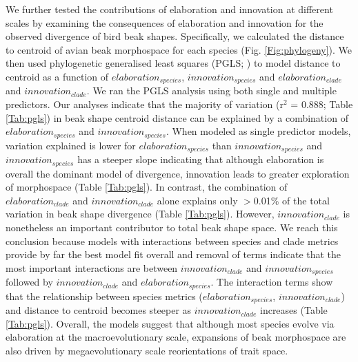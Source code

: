 \documentclass[12pt,letterpaper]{article}
\begin{document}
We further tested the contributions of elaboration and innovation at different scales by examining the consequences of elaboration and innovation for the observed divergence of bird beak shapes.
Specifically, we calculated the distance to centroid of avian beak morphospace for each species (Fig. \ref{Fig:phylogeny}).
We then used phylogenetic generalised least squares (PGLS; \cite{phylom}) to model distance to centroid as a function of $elaboration_{species}$, $innovation_{species}$ and $elaboration_{clade}$ and $innovation_{clade}$.
We ran the PGLS analysis using both single and multiple predictors.
Our analyses indicate that the majority of variation (r$^2$ = 0.888; Table \ref{Tab:pgls}) in beak shape centroid distance can be explained by a combination of $elaboration_{species}$ and $innovation_{species}$.
When modeled as single predictor models, variation explained is lower for $elaboration_{species}$ than $innovation_{species}$ and $innovation_{species}$ has a steeper slope indicating that although elaboration is overall the dominant model of divergence, innovation leads to greater exploration of morphospace (Table \ref{Tab:pgls}).
In contrast, the combination of $elaboration_{clade}$ and $innovation_{clade}$ alone explains only $>$0.01\% of the total variation in beak shape divergence (Table \ref{Tab:pgls}).
However, $innovation_{clade}$ is nonetheless an important contributor to total beak shape space.
We reach this conclusion because models with interactions between species and clade metrics provide by far the best model fit overall and removal of terms indicate that the most important interactions are between $innovation_{clade}$  and $innovation_{species}$ followed by $innovation_{clade}$ and $elaboration_{species}$.
The interaction terms show that the relationship between species metrics ($elaboration_{species}$, $innovation_{clade}$) and distance to centroid becomes steeper as $innovation_{clade}$ increases (Table \ref{Tab:pgls}).
Overall, the models suggest that although most species evolve via elaboration at the macroevolutionary scale, expansions of beak morphospace are also driven by megaevolutionary scale reorientations of trait space. %
\end{document}
